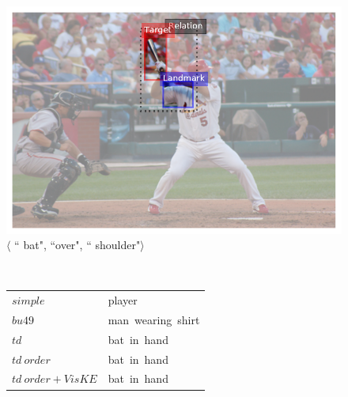\begin{figure}[ht!]
	\centering
	\begin{minipage}{0.55\linewidth}
		\centering
		\begin{minipage}{\columnwidth}
			\centering
			\includegraphics[width=\columnwidth]{studies/inlg2019/figures/2412051_bat_over_shoulder.pdf}\\
			$\langle$ ``{\color{red} bat}", ``over", ``{\color{blue} shoulder}"$\rangle$ \\
		\end{minipage} \\
		\begin{minipage}{\columnwidth}%
			\small
			\begin{tabular}{ll}
				$simple$         & {player} \\
				$bu49$           & {man~wearing~shirt} \\
				$td$             & {bat~in~hand} \\
				$td~order$       & {bat~in~hand} \\
				$td~order+VisKE$ & {bat~in~hand} \\
				\hline
			\end{tabular}
		\end{minipage}
	\end{minipage}\\
	\begin{minipage}{0.55\linewidth}
		\centering
		\begin{minipage}{\columnwidth}
			\centering

\end{minipage}
\end{minipage}
\end{figure}
